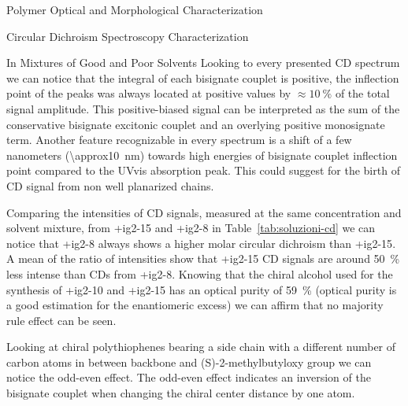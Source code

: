 \begin{section}{Polymer Optical and Morphological Characterization}
\begin{subsection}{Circular Dichroism Spectroscopy Characterization}
\begin{subsubsection}{In Mixtures of Good and Poor Solvents}
Looking to every presented \gls{CD} spectrum we can notice that the integral of each bisignate couplet is positive, the inflection point of the peaks was always located at positive values by $\approx10~\%$ of the total signal amplitude. This positive-biased signal can be interpreted as the sum of the conservative bisignate excitonic couplet and an overlying positive monosignate term. 
Another feature recognizable in every spectrum is a shift of a few nanometers (\SI{\approx10}{\nm}) towards high energies of bisignate couplet inflection point compared to the \gls{UVvis} absorption peak. This could suggest for the birth of \gls{CD} signal from non well planarized chains.

\label{majority}
Comparing the intensities of \gls{CD} signals, measured at the same concentration and solvent mixture, from \cmpd+{ig2-15} and \cmpd+{ig2-8} in Table~\ref{tab:soluzioni-cd} we can notice that \cmpd+{ig2-8} always shows a higher molar circular dichroism than \cmpd+{ig2-15}. A mean of the ratio of intensities show that \cmpd+{ig2-15} \gls{CD} signals are around 50~\% less intense than \gls{CD}s from \cmpd+{ig2-8}. 
Knowing that the chiral alcohol used for the synthesis of \cmpd+{ig2-10} and \cmpd+{ig2-15} has an optical purity of 59~\% (optical purity is a good estimation for the enantiomeric excess) we can affirm that no majority rule 
effect can be seen.

Looking at chiral poly\-thio\-phenes bearing a side chain with a different number of carbon atoms in between backbone and (S)-2-methyl\-butyl\-oxy group we can notice the odd-even effect. The odd-even effect indicates an inversion of the bisignate couplet when changing the chiral center distance by one atom.


\end{subsubsection}
\end{subsection}
\end{section}
